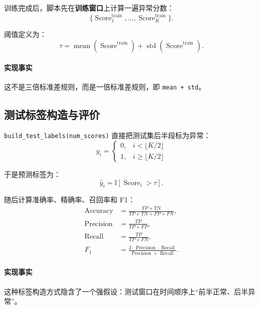 \documentclass[UTF8]{ctexart}
\begin{document}
训练完成后，脚本先在\textbf{训练窗口}上计算一遍异常分数：
\begin{equation}
    \{\operatorname{Score}^{\text{train}}_1, \dots, \operatorname{Score}^{\text{train}}_K\}.
\end{equation}

阈值定义为：
\begin{equation}
    \tau
    =
    \operatorname{mean}(\operatorname{Score}^{\text{train}})
    +
    \operatorname{std}(\operatorname{Score}^{\text{train}}).
\end{equation}

\paragraph{实现事实}
这不是三倍标准差规则，而是一倍标准差规则，即 \texttt{mean + std}。

\subsection{测试标签构造与评价}

\texttt{build\_test\_labels(num\_scores)} 直接把测试集后半段标为异常：
\begin{equation}
    y_i =
    \begin{cases}
        0, & i < \lfloor K/2 \rfloor \\
        1, & i \ge \lfloor K/2 \rfloor
    \end{cases}
\end{equation}

于是预测标签为：
\begin{equation}
    \hat{y}_i = \mathbb{I}[\operatorname{Score}_i > \tau].
\end{equation}

随后计算准确率、精确率、召回率和 F1：
\begin{align}
    \operatorname{Accuracy} &= \frac{TP + TN}{TP + TN + FP + FN}, \\
    \operatorname{Precision} &= \frac{TP}{TP + FP}, \\
    \operatorname{Recall} &= \frac{TP}{TP + FN}, \\
    F_1 &= \frac{2 \cdot \operatorname{Precision} \cdot \operatorname{Recall}}{\operatorname{Precision} + \operatorname{Recall}}.
\end{align}

\paragraph{实现事实}
这种标签构造方式隐含了一个强假设：测试窗口在时间顺序上“前半正常、后半异常”。
\end{document}
